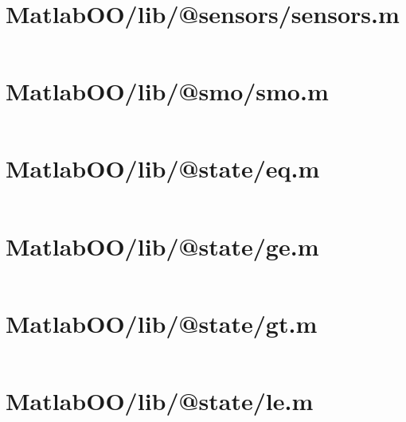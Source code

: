 \pagebreak
\section*{MatlabOO/lib/@sensors/sensors.m}\label{code:MatlabOO/lib/@sensors/sensors.m}
\inputminted[linenos,fontsize=\scriptsize]{matlab}{/home/dcouture/git/mathyourlife/TSatPy/beta_versions/matlab_object_oriented/lib/@sensors/sensors.m}

\pagebreak
\section*{MatlabOO/lib/@smo/smo.m}\label{code:MatlabOO/lib/@smo/smo.m}
\inputminted[linenos,fontsize=\scriptsize]{matlab}{/home/dcouture/git/mathyourlife/TSatPy/beta_versions/matlab_object_oriented/lib/@smo/smo.m}

\pagebreak
\section*{MatlabOO/lib/@state/eq.m}\label{code:MatlabOO/lib/@state/eq.m}
\inputminted[linenos,fontsize=\scriptsize]{matlab}{/home/dcouture/git/mathyourlife/TSatPy/beta_versions/matlab_object_oriented/lib/@state/eq.m}

\pagebreak
\section*{MatlabOO/lib/@state/ge.m}\label{code:MatlabOO/lib/@state/ge.m}
\inputminted[linenos,fontsize=\scriptsize]{matlab}{/home/dcouture/git/mathyourlife/TSatPy/beta_versions/matlab_object_oriented/lib/@state/ge.m}

\pagebreak
\section*{MatlabOO/lib/@state/gt.m}\label{code:MatlabOO/lib/@state/gt.m}
\inputminted[linenos,fontsize=\scriptsize]{matlab}{/home/dcouture/git/mathyourlife/TSatPy/beta_versions/matlab_object_oriented/lib/@state/gt.m}

\pagebreak
\section*{MatlabOO/lib/@state/le.m}\label{code:MatlabOO/lib/@state/le.m}
\inputminted[linenos,fontsize=\scriptsize]{matlab}{/home/dcouture/git/mathyourlife/TSatPy/beta_versions/matlab_object_oriented/lib/@state/le.m}

\pagebreak
